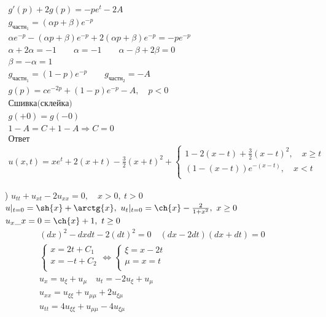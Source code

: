 \begin{enumerate}
\begin{gather*}
g'(p)+2g(p)=-pe^{t}-2A \\
  g_{\text{частн}_{1}} = (\alpha p + \beta ) e^{-p} \\
  \alpha e^{-p}- (\alpha p +\beta)e^{-p}+2(\alpha p + \beta)e^{-p} = -pe^{-p} \\
  \alpha +2\alpha = -1 \qquad \alpha = -1 \qquad \alpha - \beta +2 \beta = 0 \\
  \beta = -\alpha = 1 \\
  g_{\text{частн}_{1}} = (1-p)e^{-p} \qquad g_{\text{частн}_{2}}=-A \\
  g(p) = ce^{-2p}+(1-p)e^{-p}-A, \quad p < 0 \\
  \text{Сшивка(склейка)} \\
  g(+0)= g(-0) \\
  1-A=C+1-A \Rightarrow C = 0 \\
  \text{Ответ} \\
  \boxed{u(x,t)=xe^{t}+2(x+t)- \frac{3}{2}(x+t)^{2} +
  \begin{cases}
   1-2(x-t) + \frac{3}{2}(x-t)^{2}, \quad x \geq t \\
   (1-(x-t))e^{-(x-t)}, \quad x <t \\
\end{cases}}
\end{gather*}
\item[\text{г})] $u_{tt}+u_{xt}-2u_{xx}=0, \quad x >0, \ t>0$ \\
  $u|_{t=0}=\sh{x}+\arctg{x}, \ u_{t}|_{t=0}= \ch{x}- \frac{2}{1+x^{2}}, \ x \geq 0$ \\
  $u_{x}\_{x=0}=\ch{x}+1, \ t \geq 0$ \\
  \begin{gather*}
    (dx)^{2}-dxdt-2(dt)^{2}=0 \quad (dx-2dt)(dx+dt) = 0 \\
    \begin{cases}
     x = 2t + C_{1} \\ x = -t + C_{2} \\
    \end{cases} \Leftrightarrow
    \begin{cases}
     \xi = x-2t \\ \mu = x=t \\ 
    \end{cases} \\
    u_{x} = u_{\xi} + u_{\mu} \quad u_{t} = -2u_{\xi} + u_{\mu} \\
    u_{xx} = u_{\xi\xi} + u_{\mu\mu} + 2u_{\xi\mu} \\ 
    u_{tt} = 4u_{\xi\xi} + u_{\mu\mu} -4u_{\xi\mu} \\

\end{gather*}
\end{enumerate}
